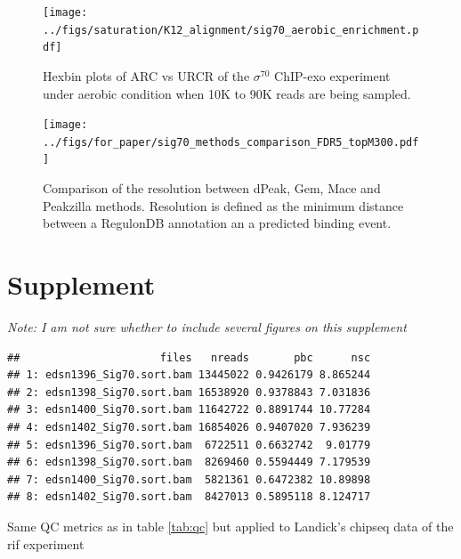 \documentclass{bmcart}\usepackage[]{graphicx}\usepackage[]{color}
\makeatletter
\newenvironment{kframe}{%
 \def\at@end@of@kframe{}%
 \ifinner\ifhmode%
  \def\at@end@of@kframe{\end{minipage}}%
  \begin{minipage}{\columnwidth}%
 \fi\fi%
 \def\FrameCommand##1{\hskip\@totalleftmargin \hskip-\fboxsep
 \colorbox{shadecolor}{##1}\hskip-\fboxsep
     \hskip-\linewidth \hskip-\@totalleftmargin \hskip\columnwidth}%
 \MakeFramed {\advance\hsize-\width
   \@totalleftmargin\z@ \linewidth\hsize
   \@setminipage}}%
 {\par\unskip\endMakeFramed%
 \at@end@of@kframe}
\newenvironment{knitrout}{}{} %
\newcommand{\sig}{\sigma^{70}}
\makeatother
\begin{document}
\begin{figure}[h!]
  \centering
\texttt{[image: ../figs/saturation/K12\_alignment/sig70\_aerobic\_enrichment.pdf]}
\caption{Hexbin plots of ARC vs URCR of the $\sig$ ChIP-exo experiment
  under aerobic condition when 10K to 90K reads are being sampled.}
  \label{fig:exoQC_sat_aero}
\end{figure}

\newpage


\begin{figure}[h!]
  \centering
  \texttt{[image: ../figs/for\_paper/sig70\_methods\_comparison\_FDR5\_topM300.pdf]}
  \caption{Comparison of the resolution between dPeak, Gem, Mace and
    Peakzilla methods. Resolution is defined as the minimum distance
    between a RegulonDB annotation an a predicted binding event.}
  \label{fig:methods_comp}
\end{figure}

\newpage

\section*{Supplement}
\label{sec:supp}

\emph{Note: I am not sure whether to include several figures on this supplement}

\begin{table}[h!]
  \centering
\begin{knitrout}
\color{fgcolor}\begin{kframe}
\begin{verbatim}
##                      files   nreads       pbc      nsc
## 1: edsn1396_Sig70.sort.bam 13445022 0.9426179 8.865244
## 2: edsn1398_Sig70.sort.bam 16538920 0.9378843 7.031836
## 3: edsn1400_Sig70.sort.bam 11642722 0.8891744 10.77284
## 4: edsn1402_Sig70.sort.bam 16854026 0.9407020 7.936239
## 5: edsn1396_Sig70.sort.bam  6722511 0.6632742  9.01779
## 6: edsn1398_Sig70.sort.bam  8269460 0.5594449 7.179539
## 7: edsn1400_Sig70.sort.bam  5821361 0.6472382 10.89898
## 8: edsn1402_Sig70.sort.bam  8427013 0.5895118 8.124717
\end{verbatim}
\end{kframe}
\end{knitrout}
\caption{Same QC metrics as in table \ref{tab:qc} but applied to
  Landick's chipseq data of the rif experiment}
\end{table}
\end{document}
